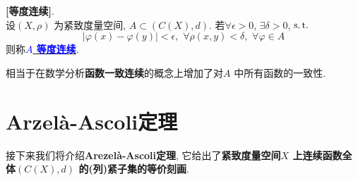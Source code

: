 	\begin{defn}\label{def 1.7.3}
		\textbf{[等度连续]}. \\
		设$(X , \rho)$ 为紧致度量空间, $A \subset (C(X) , d)$. 若$\forall \epsilon > 0$, $\exists \delta > 0$, $\operatorname{s.t.}$
		\[ \left| \varphi(x) - \varphi(y) \right| < \epsilon , \,\, \forall \rho(x , y) < \delta , \,\, \forall \varphi \in A \]
		则称\underline{\textcolor{blue}{\textbf{$A$ 等度连续}}}.
		
		\vspace{2em}
		
		\begin{rmk}
			相当于在数学分析\textbf{函数一致连续}的概念上增加了对$A$ 中所有函数的一致性.
		\end{rmk}
	\end{defn}

\newpage

\section{Arzel\`{a}-Ascoli定理}
	接下来我们将介绍\textbf{Arezel\`{a}-Ascoli定理}, 它给出了\textbf{紧致度量空间$X$ 上连续函数全体$(C(X) , d)$ 的(列)紧子集的等价刻画}.
	
